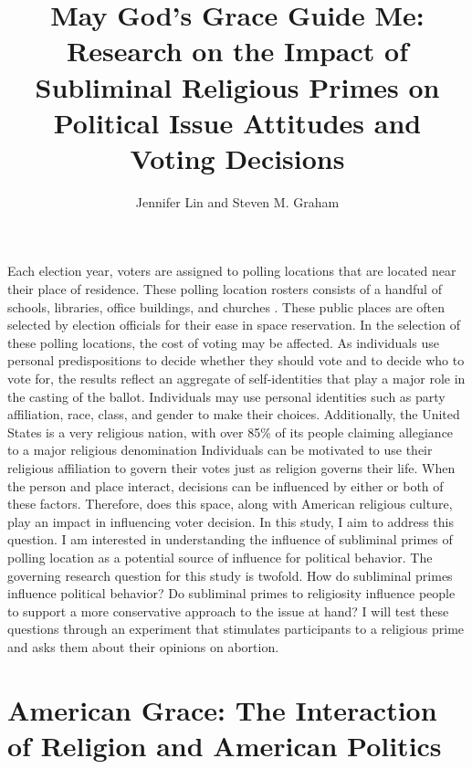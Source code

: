 \documentclass[letterpaper,man,natbib,noextraspace,12pt]{apa6}  %
\title{\large{May God’s Grace Guide Me: Research on the Impact of Subliminal Religious Primes on Political Issue Attitudes and Voting Decisions}}
\author{Jennifer Lin and Steven M. Graham}
\affiliation{New College of Florida}
\begin{document}
\maketitle

Each election year, voters are assigned to polling locations that are located near their place of residence. These polling location rosters consists of a handful of schools, libraries, office buildings, and churches \citep{barreto_are_2009}. These public places are often selected by election officials for their ease in space reservation. In the selection of these polling locations, the cost of voting may be affected. As individuals use personal predispositions to decide whether they should vote and to decide who to vote for, the results reflect an aggregate of self-identities that play a major role in the casting of the ballot. Individuals may use personal identities such as party affiliation, race, class, and gender to make their choices. Additionally, the United States is a very religious nation, with over 85\% of its people claiming allegiance to a major religious denomination \citep{domke_god_2008, putnam_american_2010} Individuals can be motivated to use their religious affiliation to govern their votes just as religion governs their life. When the person and place interact, decisions can be influenced by either or both of these factors. Therefore, does this space, along with American religious culture, play an impact in influencing voter decision. In this study, I aim to address this question. I am interested in understanding the influence of subliminal primes of polling location as a potential source of influence for political behavior. The governing research question for this study is twofold. How do subliminal primes influence political behavior? Do subliminal primes to religiosity influence people to support a more conservative approach to the issue at hand? I will test these questions through an experiment that stimulates participants to a religious prime and asks them about their opinions on abortion. 

\section{American Grace: The Interaction of Religion and American Politics}
\end{document}

